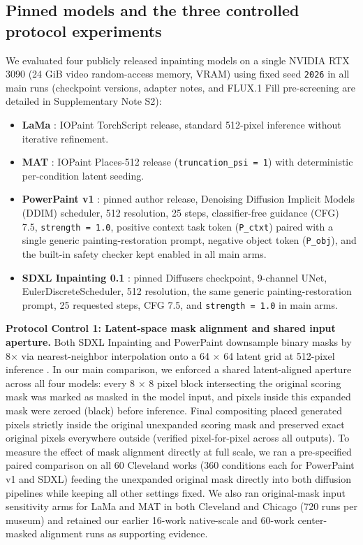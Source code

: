 \documentclass[fleqn,12pt,lineno]{wlpeerj}
\providecommand{\tightlist}{\setlength{\itemsep}{0pt}\setlength{\parskip}{0pt}}
\begin{document}
\subsection{Pinned models and the three controlled protocol experiments}\label{pinned-models-and-the-three-controlled-protocol-experiments}

We evaluated four publicly released inpainting models on a single NVIDIA RTX 3090 (24 GiB video random-access memory, VRAM) using fixed seed \texttt{2026} in all main runs (checkpoint versions, adapter notes, and FLUX.1 Fill \citep{fluxfill} pre-screening are detailed in Supplementary Note S2):

\begin{itemize}
\tightlist
\item
  \textbf{LaMa} \citep{suvorov2021}: IOPaint TorchScript release, standard 512-pixel inference without iterative refinement.
\item
  \textbf{MAT} \citep{li2022mat}: IOPaint Places-512 release (\texttt{truncation\_psi\ =\ 1}) with deterministic per-condition latent seeding.
\item
  \textbf{PowerPaint v1} \citep{zhuang2023}: pinned author release, Denoising Diffusion Implicit Models (DDIM) scheduler, 512 resolution, 25 steps, classifier-free guidance (CFG) 7.5, \texttt{strength\ =\ 1.0}, positive context task token (\texttt{P\_ctxt}) paired with a single generic painting-restoration prompt, negative object token (\texttt{P\_obj}), and the built-in safety checker kept enabled in all main arms.
\item
  \textbf{SDXL Inpainting 0.1} \citep{sdxlinpaint}: pinned Diffusers checkpoint, 9-channel UNet, EulerDiscreteScheduler, 512 resolution, the same generic painting-restoration prompt, 25 requested steps, CFG 7.5, and \texttt{strength\ =\ 1.0} in main arms.
\end{itemize}

\textbf{Protocol Control 1: Latent-space mask alignment and shared input aperture.} Both SDXL Inpainting and PowerPaint downsample binary masks by 8\ensuremath{\times} via nearest-neighbor interpolation onto a 64 \ensuremath{\times} 64 latent grid at 512-pixel inference \citep{diffuserssdxl0352, powerpaintv1src}. In our main comparison, we enforced a shared latent-aligned aperture across all four models: every 8 \ensuremath{\times} 8 pixel block intersecting the original scoring mask was marked as masked in the model input, and pixels inside this expanded mask were zeroed (black) before inference. Final compositing placed generated pixels strictly inside the original unexpanded scoring mask and preserved exact original pixels everywhere outside (verified pixel-for-pixel across all outputs). To measure the effect of mask alignment directly at full scale, we ran a pre-specified paired comparison on all 60 Cleveland works (360 conditions each for PowerPaint v1 and SDXL) feeding the unexpanded original mask directly into both diffusion pipelines while keeping all other settings fixed. We also ran original-mask input sensitivity arms for LaMa and MAT in both Cleveland and Chicago (720 runs per museum) and retained our earlier 16-work native-scale and 60-work center-masked alignment runs as supporting evidence.
\end{document}

